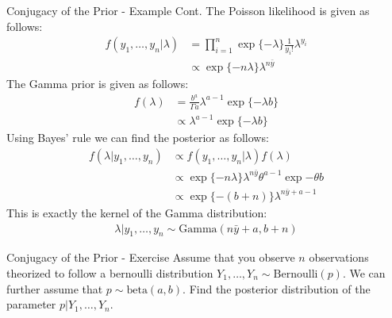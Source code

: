 \documentclass{beamer}
\begin{document}
\begin{frame}{Conjugacy of the Prior - Example  Cont.}
\small
The Poisson likelihood is given as follows:
\begin{align*}
f(y_{1},\ldots, y_{n}|\lambda) &= \prod_{i=1}^{n}\exp\{ -\lambda \}\frac{1}{y_{i}!}\lambda^{y_{i}} \\
&\propto \exp \{-n\lambda\}\lambda^{n \bar{y}}
\end{align*}
The Gamma prior is given as follows:
\begin{align*}
f(\lambda) &= \frac{b^{a}}{\Gamma{a}}\lambda^{a-1}\exp\{-\lambda b\} \\
&\propto\lambda^{a-1}\exp\{-\lambda b\}
\end{align*}
Using Bayes' rule we can find the posterior as follows:
\begin{align*}
f(\lambda|y_{1},\ldots, y_{n}) &\propto   f(y_{1},\ldots, y_{n}|\lambda) f(\lambda) \\
&\propto \exp\{-n\lambda\}\lambda^{n \bar{y}} \theta^{a-1}\exp{-\theta b}\\
&\propto \exp\{-(b + n)\} \lambda^{n\bar{y}+a-1}
\end{align*}
This is exactly the kernel of the Gamma distribution:
\begin{align*}
\lambda|y_{1},\ldots, y_{n} \sim\mathrm{Gamma}(n\bar{y}+a, b+n)
\end{align*}
\end{frame}

\begin{frame}{Conjugacy of the Prior - Exercise}
Assume that you observe $n$ observations theorized to follow a bernoulli distribution $Y_{1},\ldots, Y_{n} \sim \mathrm{Bernoulli}(p)$. We can further assume that $p \sim \mathrm{beta}(a, b)$. Find the posterior distribution of the parameter $p|Y_{1},\ldots, Y_{n}$. 
\end{frame}
\end{document}
